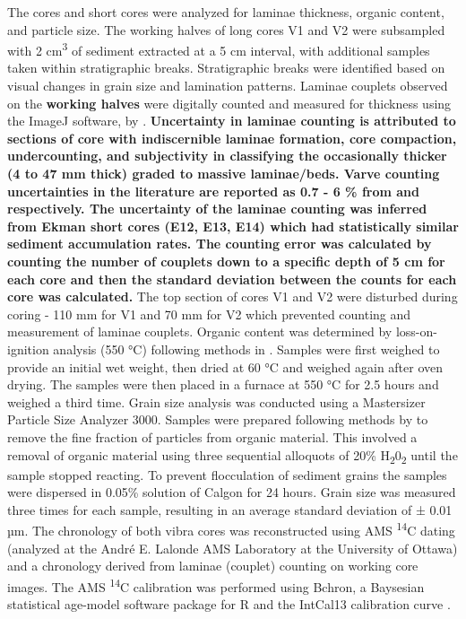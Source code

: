 \documentclass[Royal,times,doublespace,sageh]{sagej}
\begin{document}
The cores and short cores were analyzed for laminae thickness, organic
content, and particle size. The working halves of long cores V1 and V2
were subsampled with 2 cm\textsuperscript{3} of sediment extracted at a
5 cm interval, with additional samples taken within stratigraphic
breaks. Stratigraphic breaks were identified based on visual changes in
grain size and lamination patterns. Laminae couplets observed on the
\textbf{working halves} were digitally counted and measured for
thickness using the ImageJ software, by \citet{Schneider2012}.
\textbf{Uncertainty in laminae counting is attributed to sections of
core with indiscernible laminae formation, core compaction,
undercounting, and subjectivity in classifying the occasionally thicker
(4 to 47 mm thick) graded to massive laminae/beds. Varve counting
uncertainties in the literature are reported as 0.7 - 6 \% from
\citet{Menounos2008c} and \citet{Zolitschka1991} respectively. The
uncertainty of the laminae counting was inferred from Ekman short cores
(E12, E13, E14) which had statistically similar sediment accumulation
rates. The counting error was calculated by counting the number of
couplets down to a specific depth of 5 cm for each core and then the
standard deviation between the counts for each core was calculated.} The
top section of cores V1 and V2 were disturbed during coring - 110 mm for
V1 and 70 mm for V2 which prevented counting and measurement of laminae
couplets. Organic content was determined by loss-on-ignition analysis
(550 °C) following methods in \citet{Smith2003}. Samples were first
weighed to provide an initial wet weight, then dried at 60 °C and
weighed again after oven drying. The samples were then placed in a
furnace at 550 °C for 2.5 hours and weighed a third time. Grain size
analysis was conducted using a Mastersizer Particle Size Analyzer 3000.
Samples were prepared following methods by \citet{Gray2010} to remove
the fine fraction of particles from organic material. This involved a
removal of organic material using three sequential alloquots of 20\%
H\textsubscript{2}0\textsubscript{2} until the sample stopped reacting.
To prevent flocculation of sediment grains the samples were dispersed in
0.05\% solution of Calgon for 24 hours. Grain size was measured three
times for each sample, resulting in an average standard deviation of ±
0.01 µm. The chronology of both vibra cores was reconstructed using AMS
\textsuperscript{14}C dating (analyzed at the André E. Lalonde AMS
Laboratory at the University of Ottawa) and a chronology derived from
laminae (couplet) counting on working core images. The AMS
\textsuperscript{14}C calibration was performed using Bchron, a
Baysesian statistical age-model software package for R
\citep{Parnell2008, Parnell2011, Haslett2008} and the IntCal13
calibration curve \citep{Reimer2013}.
\end{document}

